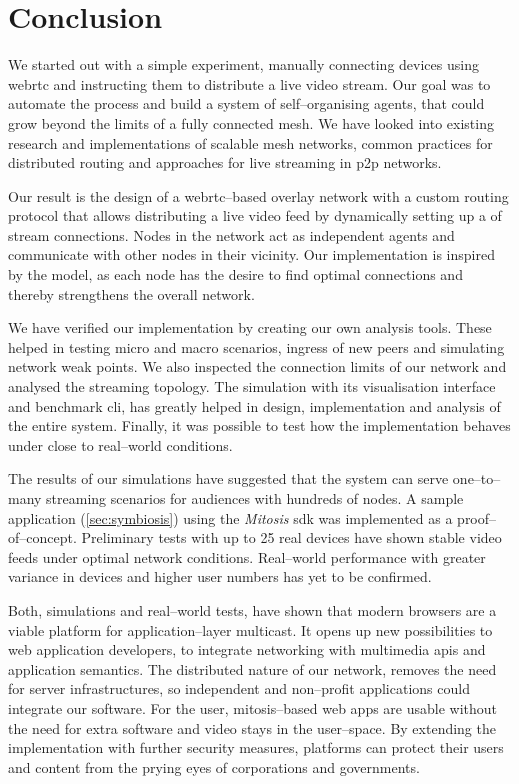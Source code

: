 \section{Conclusion}
We started out with a simple experiment, manually connecting devices using \gls{webrtc} and instructing them to distribute a live video stream.
Our goal was to automate the process and build a system of self–organising agents, that could grow beyond the limits of a fully connected mesh.
We have looked into existing research and implementations of scalable mesh networks, common practices for distributed routing and approaches for live streaming in \gls{p2p} networks.

Our result is the design of a \gls{webrtc}–based overlay network with a custom routing protocol that allows distributing a live video feed by dynamically setting up a  of stream connections. Nodes in the network act as independent agents and communicate with other nodes in their vicinity. Our implementation is inspired by the  model, as each node has the desire to find optimal connections and thereby strengthens the overall network.

We have verified our implementation by creating our own analysis tools. These helped in testing micro and macro scenarios, ingress of new peers and simulating network weak points. We also inspected the connection limits of our network and analysed the streaming topology. The simulation with its visualisation interface and benchmark \gls{cli}, has greatly helped in design, implementation and analysis of the entire system. Finally, it was possible to test how the implementation behaves under close to real–world conditions.

The results of our simulations have suggested that the system can serve one–to–many streaming scenarios for audiences with hundreds of nodes. A sample application (\vref{sec:symbiosis}) using the \textit{Mitosis} \gls{sdk} was implemented as a proof–of–concept. Preliminary tests with up to 25 real devices have shown stable video feeds under optimal network conditions. Real–world performance with greater variance in devices and higher user numbers has yet to be confirmed.

Both, simulations and real–world tests, have shown that modern browsers are a viable platform for application–layer multicast. It opens up new possibilities to web application developers, to integrate networking with multimedia \glspl{api} and application semantics. The distributed nature of our network, removes the need for server infrastructures, so independent and non–profit applications could integrate our software. For the user, \gls{mitosis}–based web apps are usable without the need for extra software and video stays in the user–space. By extending the implementation with further security measures, platforms can protect their users and content from the prying eyes of corporations and governments.

